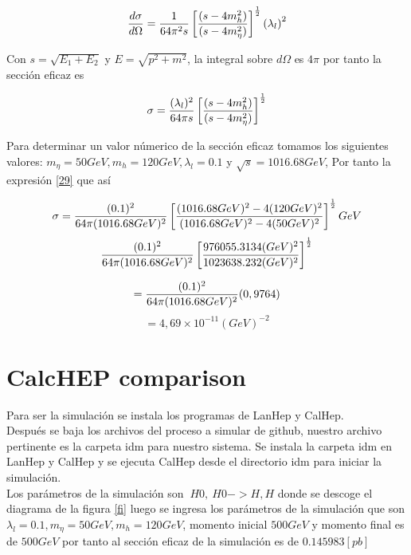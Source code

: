      \begin{equation}
      \frac{d\sigma}{d\Omega}=\frac{1}{64\small{\pi} ^{2}s}\left[\frac{(s-4m_{h}^{2})}{(s-4m_{\eta}^{2})}\right]^{\frac{1}{2}}\left(\lambda_{l}\right)^{2}
          \label{28}
     \end{equation}
     
     
Con $s=\sqrt{E_{1}+E_{2}}$ y $E=\sqrt{p^{2}+m^{2}}$, la integral sobre $d\Omega$ es $4\pi$ por tanto la sección eficaz es 


\begin{equation}
  \sigma=\frac{(\lambda_{l})^{2}}{64\small{\pi} s}\left[\frac{(s-4m_{h}^{2})}{(s-4m_{\eta}^{2})}\right]^{\frac{1}{2}}
  \label{29}
\end{equation}  
          
     
     
Para determinar un valor númerico de la sección eficaz tomamos los siguientes valores: $ m_{\eta}=50GeV, m_{h}=120 GeV, \lambda_{l}=0.1$ y $\sqrt{s}=1016.68GeV $, Por tanto la expresión \ref{29} que así

\begin{equation*}
\sigma=\frac{(0.1)^{2}}{64\small{\pi} (1016.68GeV)^{2}}\left[\frac{(1016.68GeV)^{2}-4(120GeV)^{2}}{(1016.68GeV)^{2}-4(50GeV)^{2}}\right]^{\frac{1}{2}}
\label{30}GeV
\end{equation*}
     \begin{equation*}
    \frac{(0.1)^{2}}{64\small{\pi} (1016.68GeV)^{2}}\left[\frac{976055.3134 (GeV)^{2}}{1023638.232(GeV)^{2}}\right]^{\frac{1}{2}}
     \end{equation*}
              
\begin{equation*}
   = \frac{(0.1)^{2}}{64\small{\pi} (1016.68GeV)^{2}}(0,9764)
     \end{equation*}   
     \begin{equation}
    =4,69\times 10^{-11}(GeV)^{-2}
     \end{equation}              
              
\section{CalcHEP comparison}
Para ser la simulación se instala los programas de LanHep y CalHep.\\
Después se baja los archivos del proceso a simular de github, nuestro archivo pertinente es la carpeta idm para nuestro sistema. Se  instala la carpeta idm  en LanHep y CalHep y se ejecuta  CalHep desde el directorio idm para iniciar la simulación.\\
Los parámetros de la simulación son $~H0,~H0->H,H$ donde se descoge el diagrama de la figura \ref{fi} luego se ingresa los parámetros de la simulación que son $\lambda_{l}=0.1, m_{\eta}=50 GeV, m_{h}=120 GeV$, momento inicial $500 GeV$ y momento final es de $500GeV$ por tanto al sección eficaz de la simulación es de $0.145983[pb]$  

